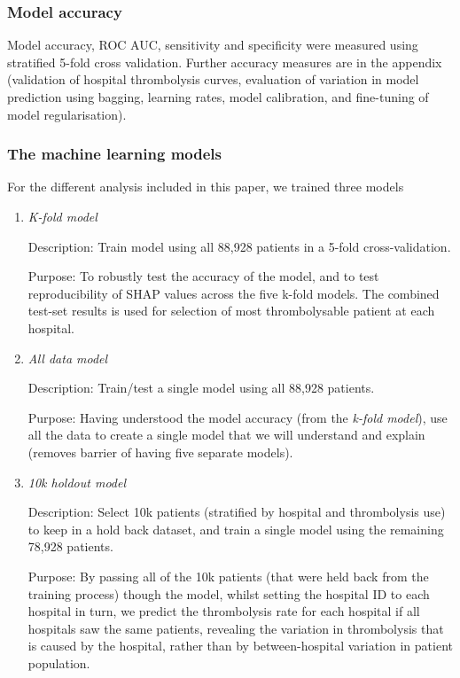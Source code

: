 \subsubsection{Model accuracy}
Model accuracy, ROC AUC, sensitivity and specificity were measured using stratified 5-fold cross validation. Further accuracy measures are in the appendix (validation of hospital thrombolysis curves, evaluation of variation in model prediction using bagging, learning rates, model calibration, and
fine-tuning of model regularisation).

\subsubsection{The machine learning models}

For the different analysis included in this paper, we trained three models
\begin{enumerate}
    \item {\emph{K-fold model}}
    
    Description: Train model using all 88,928 patients in a 5-fold cross-validation.
    
    Purpose: To robustly test the accuracy of the model, and to test reproducibility of SHAP values across the five k-fold models. The combined test-set results is used for selection of most thrombolysable patient at each hospital.
    \item {\emph{All data model}}
    
    Description: Train/test a single model using all 88,928 patients.
    
    Purpose: Having understood the model accuracy (from the \emph{k-fold model}), use all the data to create a single model that we will understand and explain (removes barrier of having five separate models).
    \item {\emph{10k holdout model}}

    Description: Select 10k patients (stratified by hospital and thrombolysis use) to keep in a hold back dataset, and train a single model using the remaining 78,928 patients. 
    
    Purpose: By passing all of the 10k patients (that were held back from the training process) though the model, whilst setting the hospital ID to each hospital in turn, we predict the thrombolysis rate for each hospital if all hospitals saw the same patients, revealing the variation in thrombolysis that is caused by the hospital, rather than by between-hospital variation in patient population.
\end{enumerate}

